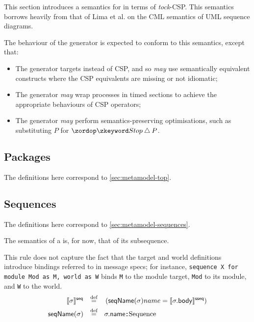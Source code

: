 
This section introduces a semantics for \langname{} in terms of
\emph{tock}-CSP.
This semantics borrows heavily from that of Lima et al. on the CML semantics of
UML sequence diagrams.

The behaviour of the \langname{} generator is expected to conform to
this semantics, except that:

\begin{itemize}
\item
	The generator targets \cspm{} instead of CSP, and so \emph{may}
	use semantically equivalent \cspm{} constructs where the CSP equivalents
	are missing or not idiomatic;
\item
	The generator \emph{may}  wrap processes in
	timed sections to achieve the appropriate \tockcsp{} behaviours of
	CSP operators;
\item
	The generator \emph{may} perform semantics-preserving optimisations,
	such as substituting \(P\) for \(\Stop \interrupt P\).
\end{itemize}

\subsection{Packages}\label{ssec:semantics-tockcsp-top}

The definitions here correspond to \cref{sec:metamodel-top}.


\subsection{Sequences}\label{ssec:semantics-tockcsp-sequences}

The definitions here correspond to \cref{sec:metamodel-sequences}.

\begin{defn}[\msequence]

The semantics of a \msequence{} is, for now, that of its subsequence.

This rule does not capture the fact that the target and world definitions
introduce bindings referred to in message specs; for instance,
\lstinline[language=RoboCert]{sequence X for module Mod as M, world as W}
binds \lstinline[language=RoboCert]{M} to the module target,
\lstinline[language=RoboCert]{Mod} to its module, and
\lstinline[language=RoboCert]{W} to the world.
%
\begin{align*}
	\llbracket \sigma \rrbracket^{\mathsf{seq}}
\quad\mathbin{\overset{\text{def}}=}\quad&	
\left(
	\mathsf{seqName}(\sigma){name} = \llbracket \sigma.\mathsf{body} \rrbracket^{\mathsf{sseq}}
\right)
\\
	\mathsf{seqName}(\sigma)
\quad\mathbin{\overset{\text{def}}=}\quad&
	\sigma.\mathsf{name} \mathbin{\!:\!:\!} \text{Sequence}
\end{align*}

\end{defn}

